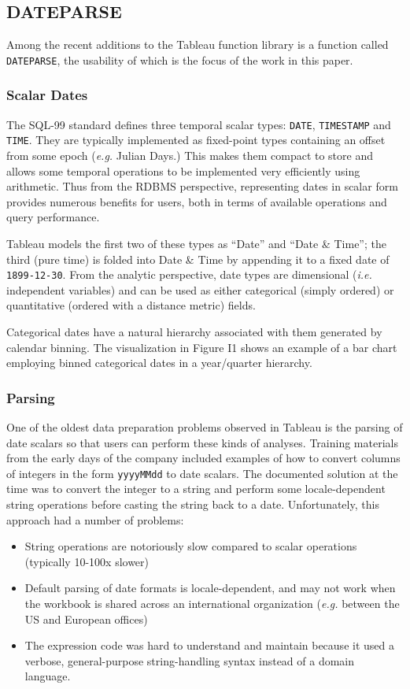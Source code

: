 \subsection{DATEPARSE}
Among the recent additions to the Tableau function library is a function called \texttt{DATEPARSE}, the usability of which is the focus of the work in this paper.

\subsubsection{	Scalar Dates}
The SQL-99 standard defines three temporal scalar types: \texttt{DATE}, \texttt{TIMESTAMP} and \texttt{TIME}. They are typically implemented as fixed-point types containing an offset from some epoch (\textit{e.g.} Julian Days.) This makes them compact to store and allows some temporal operations to be implemented very efficiently using arithmetic. Thus from the RDBMS perspective, representing dates in scalar form provides numerous benefits for users, both in terms of available operations and query performance.

Tableau models the first two of these types as ``Date'' and ``Date \& Time''; the third (pure time) is folded into Date \& Time by appending it to a fixed date of \texttt{1899-12-30}. From the analytic perspective, date types are dimensional (\textit{i.e.} independent variables) and can be used as either categorical (simply ordered) or quantitative (ordered with a distance metric) fields.

Categorical dates have a natural hierarchy associated with them generated by calendar binning. The visualization in Figure I1 shows an example of a bar chart employing binned categorical dates in a year/quarter hierarchy.

\subsubsection{Parsing}
One of the oldest data preparation problems observed in Tableau is the parsing of date scalars so that users can perform these kinds of analyses. Training materials from the early days of the company included examples of how to convert columns of integers in the form \texttt{yyyyMMdd} to date scalars. The documented solution at the time was to convert the integer to a string and perform some locale-dependent string operations before casting the string back to a date. Unfortunately, this approach had a number of problems:
\begin{itemize}
\item String operations are notoriously slow compared to scalar operations (typically 10-100x slower)
\item Default parsing of date formats is locale-dependent, and may not work when the workbook is shared across an international organization (\textit{e.g.} between the US and European offices)
\item The expression code was hard to understand and maintain because it used a verbose, general-purpose string-handling syntax instead of a domain language.
\end{itemize}

